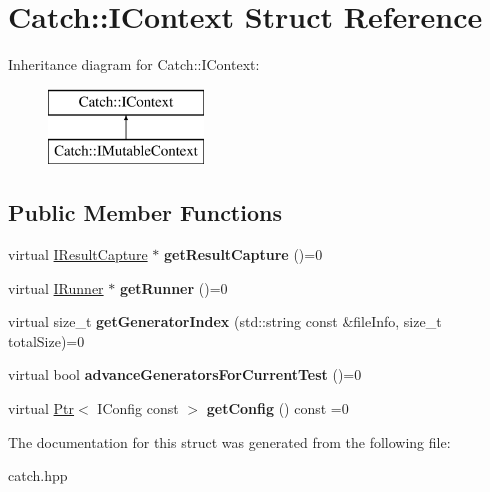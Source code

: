 \hypertarget{structCatch_1_1IContext}{}\section{Catch\+:\+:I\+Context Struct Reference}
\label{structCatch_1_1IContext}
Inheritance diagram for Catch\+:\+:I\+Context\+:\begin{figure}[H]
\begin{center}
\leavevmode
\includegraphics[height=2.000000cm]{structCatch_1_1IContext}
\end{center}
\end{figure}
\subsection*{Public Member Functions}
\begin{DoxyCompactItemize}
\item 
virtual \hyperlink{structCatch_1_1IResultCapture}{I\+Result\+Capture} $\ast$ {\bfseries get\+Result\+Capture} ()=0\hypertarget{structCatch_1_1IContext_a684e4ae71d1fdf3060c352ecde1d122f}{}\label{structCatch_1_1IContext_a684e4ae71d1fdf3060c352ecde1d122f}

\item 
virtual \hyperlink{structCatch_1_1IRunner}{I\+Runner} $\ast$ {\bfseries get\+Runner} ()=0\hypertarget{structCatch_1_1IContext_af088415dde18d039ed5a2f95b02767c6}{}\label{structCatch_1_1IContext_af088415dde18d039ed5a2f95b02767c6}

\item 
virtual size\+\_\+t {\bfseries get\+Generator\+Index} (std\+::string const \&file\+Info, size\+\_\+t total\+Size)=0\hypertarget{structCatch_1_1IContext_a43e07088db43299ba129fbe6d3106e95}{}\label{structCatch_1_1IContext_a43e07088db43299ba129fbe6d3106e95}

\item 
virtual bool {\bfseries advance\+Generators\+For\+Current\+Test} ()=0\hypertarget{structCatch_1_1IContext_a806f7c4ed24d51adae90418e661b24b7}{}\label{structCatch_1_1IContext_a806f7c4ed24d51adae90418e661b24b7}

\item 
virtual \hyperlink{classCatch_1_1Ptr}{Ptr}$<$ I\+Config const  $>$ {\bfseries get\+Config} () const  =0\hypertarget{structCatch_1_1IContext_a9b6759547b9af1e77b6bc9f0dd596ac2}{}\label{structCatch_1_1IContext_a9b6759547b9af1e77b6bc9f0dd596ac2}

\end{DoxyCompactItemize}


The documentation for this struct was generated from the following file\+:\begin{DoxyCompactItemize}
\item 
catch.\+hpp\end{DoxyCompactItemize}
